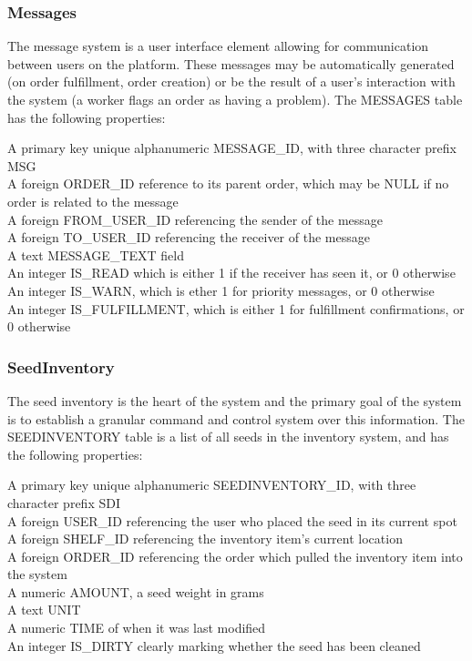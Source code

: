 \documentclass[12pt, letterpaper,oneocolumn]{article}
\begin{document}
		\subsubsection{Messages}
The message system is a user interface element allowing for communication between users on the platform. These messages may be automatically generated (on order fulfillment, order creation) or be the result of a user's interaction with the system (a worker flags an order as having a problem). The MESSAGES table has the following properties:\\
\begin{outline}
\1 A primary key unique alphanumeric MESSAGE\_ID, with three character prefix MSG\\
\1 A foreign ORDER\_ID reference to its parent order, which may be NULL if no order is related to the message\\
\1 A foreign FROM\_USER\_ID referencing the sender of the message\\
\1 A foreign TO\_USER\_ID referencing the receiver of the message\\
\1 A text MESSAGE\_TEXT field\\
\1 An integer IS\_READ which is either 1 if the receiver has seen it, or 0 otherwise\\
\1 An integer IS\_WARN, which is ether 1 for priority messages, or 0 otherwise\\
\1 An integer IS\_FULFILLMENT, which is either 1 for fulfillment confirmations, or 0 otherwise\\
	\end{outline}

	\subsubsection{SeedInventory}
The seed inventory is the heart of the system and the primary goal of the system is to establish a granular command and control system over this information. The SEEDINVENTORY table is a list of all seeds in the inventory system, and has the following properties:\\
\begin{outline}
	\1 A primary key unique alphanumeric SEEDINVENTORY\_ID, with three character prefix SDI\\
	\1 A foreign USER\_ID referencing the user who placed the seed in its current spot\\
	\1 A foreign SHELF\_ID referencing the inventory item's current location\\
	\1 A foreign ORDER\_ID referencing the order which pulled the inventory item into the system\\
	\1 A numeric AMOUNT, a seed weight in grams\\
	\1 A text UNIT\\
	\1 A numeric TIME of when it was last modified\\
	\1 An integer IS\_DIRTY clearly marking whether the seed has been cleaned\\
\end{outline}
\end{document}
